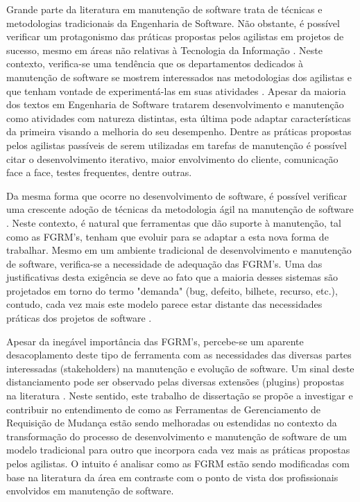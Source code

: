 \documentclass[msc,proposal,hidelot,hideabstract]{ppgccufmg} %
\begin{document}


Grande parte da literatura em manutenção de software trata de técnicas e metodologias tradicionais da Engenharia de Software. Não obstante, é possível verificar um protagonismo das práticas propostas pelos agilistas em projetos de sucesso, mesmo em áreas não relativas à Tecnologia da Informação \cite{Serrador2015}. Neste contexto, verifica-se uma tendência que os departamentos dedicados à manutenção de software se mostrem interessados nas metodologias dos agilistas e que tenham vontade de experimentá-las em suas atividades \cite{Heeager2015}. Apesar da maioria dos textos em Engenharia de Software tratarem desenvolvimento e manutenção como atividades com natureza distintas, esta última pode adaptar características da primeira visando a melhoria do seu desempenho. Dentre as práticas propostas pelos agilistas passíveis de serem utilizadas em tarefas de manutenção é possível citar o desenvolvimento iterativo, maior envolvimento do cliente, comunicação face a face, testes frequentes, dentre outras.



Da mesma forma que ocorre no desenvolvimento de software, é possível verificar uma crescente adoção de técnicas da metodologia ágil na manutenção de software \cite{Soltan2016,Devulapally2015, Heeager2015}. Neste contexto, é natural que ferramentas que dão suporte à manutenção, tal como as FGRM's, tenham que evoluir para se adaptar a esta nova forma de trabalhar. Mesmo em um ambiente tradicional de  desenvolvimento e manutenção de software, verifica-se a necessidade de adequação das FGRM's. Uma das justificativas desta exigência se deve ao fato que a maioria desses sistemas são projetados em torno do termo "demanda" (bug, defeito, bilhete, recurso, etc.), contudo, cada vez mais este modelo parece estar distante das necessidades práticas dos projetos de software \cite{Baysal:2013:SAP:2486788.2486957}.


Apesar da inegável importância das FGRM's, percebe-se um aparente desacoplamento deste tipo de ferramenta com as necessidades das diversas partes interessadas (stakeholders) na manutenção e evolução de software. Um sinal deste distanciamento pode ser observado pelas diversas extensões (plugins) propostas na literatura \cite{101186,Thung:2014:BIT:2635868.2661678,Kononenko:2014:DED:2591062.2591075}. Neste sentido, este trabalho de dissertação se propõe a investigar e contribuir no entendimento de como as Ferramentas de Gerenciamento de Requisição de Mudança estão sendo melhoradas ou estendidas no contexto da transformação do processo de desenvolvimento e manutenção de software de um modelo tradicional para outro que incorpora cada vez mais as práticas propostas pelos agilistas. O intuito é analisar como as FGRM estão sendo modificadas com base na literatura da área em contraste com o ponto de vista dos profissionais envolvidos em manutenção de software.
 
\end{document}
